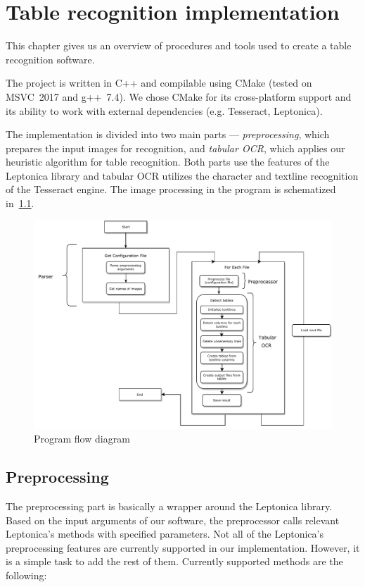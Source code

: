 \chapter{Table recognition implementation}

This chapter gives us an overview of procedures and tools used to create a table recognition software. 

The project is written in C++ and compilable using CMake (tested on MSVC~2017 and g++~7.4). We chose CMake for its cross-platform support and its ability to work with external dependencies (e.g. Tesseract, Leptonica). 

The implementation is divided into two main parts --- \emph{preprocessing}, which prepares the input images for recognition, and \emph{tabular OCR}, which applies our heuristic algorithm for table recognition. Both parts use the features of the Leptonica library and tabular OCR utilizes the character and textline recognition of the Tesseract engine. The image processing in the program is schematized in~\cref{fig:programFlow}.

\begin{figure}
    \centering
	\includegraphics[width=1.0\linewidth]{img/implementation/programFlow.pdf}
	\caption{Program flow diagram}
	\label{fig:programFlow}
\end{figure}

\section{Preprocessing}

The preprocessing part is basically a wrapper around the Leptonica library. Based on the input arguments of our software, the preprocessor calls relevant Leptonica's methods with specified parameters. Not all of the Leptonica's preprocessing features are currently supported in our implementation. However, it is a simple task to add the rest of them. Currently supported methods are the following:

